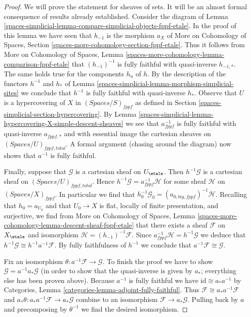 \begin{proof}
We will prove the statement for sheaves of sets. It will be an
almost formal consequence of results already established.
Consider the diagram of
Lemma \ref{spaces-simplicial-lemma-compare-simplicial-objects-fppf-etale}.
In the proof of this lemma we have seen that
$h_{-1}$ is the morphism $a_X$ of
More on Cohomology of Spaces, Section
\ref{spaces-more-cohomology-section-fppf-etale}.
Thus it follows from
More on Cohomology of Spaces, Lemma
\ref{spaces-more-cohomology-lemma-comparison-fppf-etale}
that $(h_{-1})^{-1}$ is fully faithful with quasi-inverse $h_{-1, *}$.
The same holds true for the components $h_n$ of $h$.
By the description of the functors $h^{-1}$ and $h_*$ of
Lemma \ref{spaces-simplicial-lemma-morphism-simplicial-sites}
we conclude that $h^{-1}$ is fully faithful with quasi-inverse $h_*$.
Observe that $U$ is a hypercovering of $X$ in $(\textit{Spaces}/S)_{fppf}$
as defined in Section \ref{spaces-simplicial-section-hypercovering}.
By Lemma \ref{spaces-simplicial-lemma-hypercovering-X-simple-descent-sheaves}
we see that $a_{fppf}^{-1}$ is fully faithful with quasi-inverse
$a_{fppf, *}$ and with essential image the cartesian sheaves
on $(\textit{Spaces}/U)_{fppf, total}$.
A formal argument (chasing around the diagram) now shows that
$a^{-1}$ is fully faithful.

\medskip\noindent
Finally, suppose that $\mathcal{G}$ is a cartesian sheaf on $U_\etale$.
Then $h^{-1}\mathcal{G}$ is a cartesian sheaf on
$(\textit{Spaces}/U)_{fppf, total}$. Hence
$h^{-1}\mathcal{G} = a_{fppf}^{-1}\mathcal{H}$ for some sheaf
$\mathcal{H}$ on $(\textit{Spaces}/X)_{fppf}$.
In particular we find that
$h_0^{-1}\mathcal{G}_0 = (a_{0, big, fppf})^{-1}\mathcal{H}$.
Recalling that $h_0 = a_{U_0}$ and that $U_0 \to X$ is
flat, locally of finite presentation, and surjective, we
find from More on Cohomology of Spaces,
Lemma \ref{spaces-more-cohomology-lemma-descent-sheaf-fppf-etale}
that there exists a sheaf $\mathcal{F}$ on $X_\etale$ and isomorphism
$\mathcal{H} = (h_{-1})^{-1}\mathcal{F}$.
Since $a_{fppf}^{-1}\mathcal{H} = h^{-1}\mathcal{G}$
we deduce that $h^{-1}\mathcal{G} \cong h^{-1}a^{-1}\mathcal{F}$.
By fully faithfulness of $h^{-1}$ we conclude that
$a^{-1}\mathcal{F} \cong \mathcal{G}$.

\medskip\noindent
Fix an isomorphism $\theta : a^{-1}\mathcal{F} \to \mathcal{G}$.
To finish the proof we have to show $\mathcal{G} = a^{-1}a_*\mathcal{G}$
(in order to show that the quasi-inverse is given by $a_*$; everything
else has been proven above).
Because $a^{-1}$ is fully faithful we have $\text{id} \cong a_*a^{-1}$ by
Categories, Lemma \ref{categories-lemma-adjoint-fully-faithful}.
Thus $\mathcal{F} \cong a_*a^{-1}\mathcal{F}$ and
$a_*\theta : a_*a^{-1}\mathcal{F} \to a_*\mathcal{G}$
combine to an isomorphism $\mathcal{F} \to a_*\mathcal{G}$.
Pulling back by $a$ and precomposing by $\theta^{-1}$
we find the desired isomorphism.
\end{proof}

